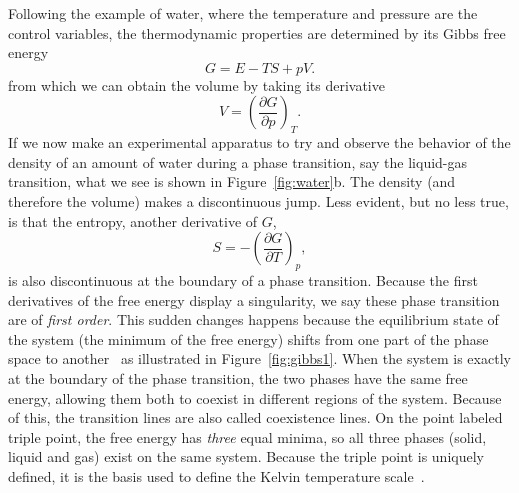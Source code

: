 Following the example of water, where the temperature and pressure are the
control variables, the thermodynamic properties are determined by its Gibbs
free energy
\begin{equation}
    G=E-TS+pV.
\end{equation}
from which we can obtain the volume by taking its derivative
\begin{equation}
    V={\left(\frac{\partial G}{\partial p}\right)}_T.
\end{equation}
If we now make an experimental apparatus to try and observe the behavior of the
density of an amount of water during a phase transition, say the liquid-gas
transition, what we see is shown in Figure~\ref{fig:water}b. The density (and
therefore the volume) makes a discontinuous jump. Less evident, but no less
true, is that the entropy, another derivative of $G$,
\begin{equation}
    S=-{\left(\frac{\partial G}{\partial T}\right)}_p,
\end{equation}
is also discontinuous at the boundary of a phase transition. Because the first
derivatives of the free energy display a singularity, we say these phase
transition are of \textit{first order}. This sudden changes happens because the
equilibrium state of the system (the minimum of the free energy) shifts from
one part of the phase space to another~\cite{Callen1985} as illustrated in
Figure~\ref{fig:gibbs1}. When the system is exactly at the boundary of the
phase transition, the two phases have the same free energy, allowing them both
to coexist in different regions of the system. Because of this, the transition
lines are also called coexistence lines. On the point labeled triple point, the
free energy has \textit{three} equal minima, so all three phases (solid, liquid
and gas) exist on the same system. Because the triple point is uniquely
defined, it is the basis used to define the Kelvin temperature
scale~\cite{Fermi1956}.

